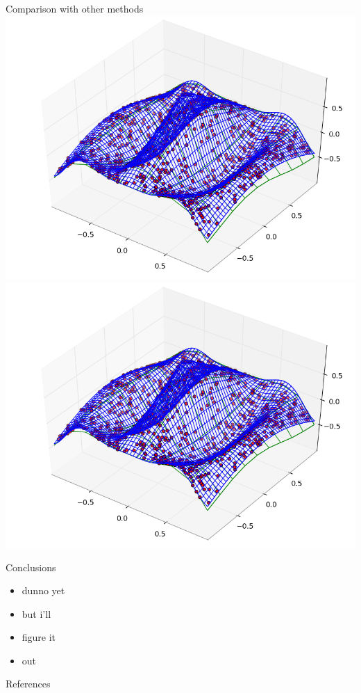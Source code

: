 \documentclass[final]{beamer}
\begin{document}
\begin{frame}{}
\begin{textblock}{27}
\begin{block}{Comparison with other methods}
\includegraphics[width=10in]{ConvergenceComparison.png}
\includegraphics[width=10in]{SpeedComparison.png}
\end{block}

\begin{block}{Conclusions}
\begin{itemize}
\item dunno yet
\item but i'll
\item figure it
\item out
\end{itemize}
\end{block}

\begin{block}{References}
{
 
 
}
\end{block}

\end{textblock}

\end{frame}
\end{document}

